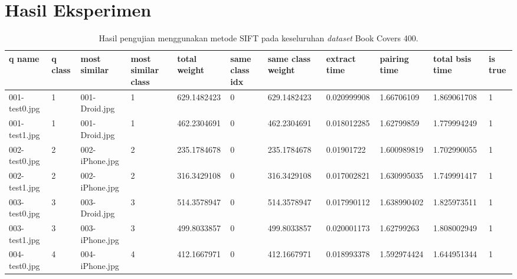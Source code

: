 \chapter{Hasil Eksperimen}
\label{lamp:B}

\def\scl{1}
\def\leg{} 
\def\std{none}
\def\ymin{}
\def\ymax{}

\begin{landscape}
\begin{longtable}{|p{2cm}|p{1cm}|p{2cm}|p{1cm}|p{2cm}|p{1cm}|p{2cm}|p{2cm}|p{2cm}|p{2cm}|p{1cm}|}
	\caption{Hasil pengujian menggunakan metode SIFT pada keseluruhan \textit{dataset} Book Covers 400.} \\
	\hline
	\textbf{q name}       & \textbf{q class} & \textbf{most similar}  & \textbf{most similar class} & \textbf{total weight} & \textbf{same class idx} & \textbf{same class weight} & \textbf{extract time} & \textbf{pairing time} & \textbf{total bsis time} & \textbf{is true}  \\ 
	\hline
	001-test0.jpg & 1        & 001-Droid.jpg  & 1                    & 629.1482423   & 0                & 629.1482423         & 0.020999908   & 1.66706109    & 1.869061708       & 1         \\ 
	\hline
	001-test1.jpg & 1        & 001-Droid.jpg  & 1                    & 462.2304691   & 0                & 462.2304691         & 0.018012285   & 1.62799859    & 1.779994249       & 1         \\ 
	\hline
	002-test0.jpg & 2        & 002-iPhone.jpg & 2                    & 235.1784678   & 0                & 235.1784678         & 0.01901722    & 1.600989819   & 1.702990055       & 1         \\ 
	\hline
	002-test1.jpg & 2        & 002-iPhone.jpg & 2                    & 316.3429108   & 0                & 316.3429108         & 0.017002821   & 1.630995035   & 1.749991417       & 1         \\ 
	\hline
	003-test0.jpg & 3        & 003-Droid.jpg  & 3                    & 514.3578947   & 0                & 514.3578947         & 0.017990112   & 1.638990402   & 1.825973511       & 1         \\ 
	\hline
	003-test1.jpg & 3        & 003-iPhone.jpg & 3                    & 499.8033857   & 0                & 499.8033857         & 0.020001173   & 1.62799263    & 1.808002949       & 1         \\ 
	\hline
	004-test0.jpg & 4        & 004-iPhone.jpg & 4                    & 412.1667971   & 0                & 412.1667971         & 0.018993378   & 1.592974424   & 1.644951344       & 1         \\ 

\end{longtable}
\end{landscape}
